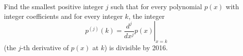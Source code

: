 Find the smallest positive integer $j$ such that for every polynomial $p(x)$ with integer coefficients and for every integer $k$, the integer
\[
p^{(j)}(k) = \left. \frac{d^j}{dx^j} p(x) \right|_{x=k} 
\] 
(the $j$-th derivative of $p(x)$ at $k$) is divisible by 2016.
